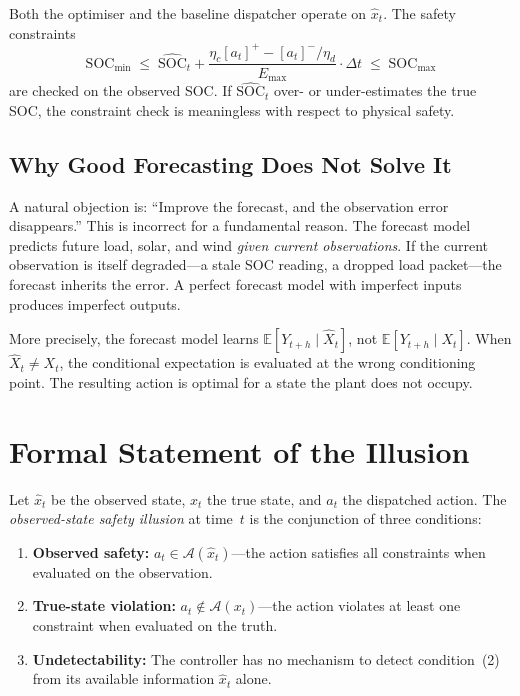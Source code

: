 Both the optimiser and the baseline dispatcher operate on
$\hat{x}_t$.  The safety constraints
\[
  \mathrm{SOC}_{\min} \;\le\;
  \widehat{\mathrm{SOC}}_t + \frac{\eta_c [a_t]^{+} - [a_t]^{-}/\eta_d}{E_{\max}} \cdot \Delta t
  \;\le\; \mathrm{SOC}_{\max}
\]
are checked on the observed SOC.  If $\widehat{\mathrm{SOC}}_t$ over- or
under-estimates the true SOC, the constraint check is meaningless with
respect to physical safety.

\subsection{Why Good Forecasting Does Not Solve It}

A natural objection is: ``Improve the forecast, and the observation error
disappears.''  This is incorrect for a fundamental reason.  The forecast
model predicts future load, solar, and wind \emph{given current
observations}.  If the current observation is itself degraded---a stale
SOC reading, a dropped load packet---the forecast inherits the error.  A
perfect forecast model with imperfect inputs produces imperfect outputs.

More precisely, the forecast model learns $\mathbb{E}[Y_{t+h} \mid
\hat{X}_t]$, not $\mathbb{E}[Y_{t+h} \mid X_t]$.  When
$\hat{X}_t \ne X_t$, the conditional expectation is evaluated at the wrong
conditioning point.  The resulting action is optimal for a state the plant
does not occupy.

\section{Formal Statement of the Illusion}
\label{sec:formal-illusion}

\begin{definition}
\label{def:safety-illusion}
Let $\hat{x}_t$ be the observed state, $x_t$ the true state, and
$a_t$ the dispatched action.  The \emph{observed-state safety illusion}
at time~$t$ is the conjunction of three conditions:
\begin{enumerate}
  \item \textbf{Observed safety:}
    $a_t \in \mathcal{A}(\hat{x}_t)$---the action satisfies all
    constraints when evaluated on the observation.
  \item \textbf{True-state violation:}
    $a_t \notin \mathcal{A}(x_t)$---the action violates at least one
    constraint when evaluated on the truth.
  \item \textbf{Undetectability:}
    The controller has no mechanism to detect condition~(2) from its
    available information $\hat{x}_t$ alone.
\end{enumerate}
\end{definition}


